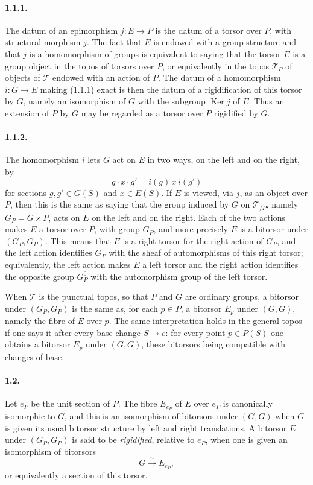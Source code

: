 \documentclass[11pt]{article}
\theoremstyle{plain}
\theoremstyle{definition}
\theoremstyle{remark}
\DeclareMathOperator{\Ker}{Ker}
\begin{document}
\paragraph{1.1.1.} The datum of an epimorphism $j:E\to P$ is the datum of a torsor over $P$, with structural morphism $j$. The fact that $E$ is endowed with a group structure and that $j$ is a homomorphism of groups is equivalent to saying that the torsor $E$ is a group object in the topos of torsors over $P$, or equivalently in the topos $\mathcal T_P$ of objects of $\mathcal T$ endowed with an action of $P$. The datum of a homomorphism $i:G\to E$ making (1.1.1) exact is then the datum of a rigidification of this torsor by $G$, namely an isomorphism of $G$ with the subgroup $\Ker j$ of $E$. Thus an extension of $P$ by $G$ may be regarded as a torsor over $P$ rigidified by $G$.

\paragraph{1.1.2.} The homomorphism $i$ lets $G$ act on $E$ in two ways, on the left and on the right, by
\[
g\cdot x\cdot g'=i(g)\,x\,i(g')
\]
for sections $g,g'\in G(S)$ and $x\in E(S)$. If $E$ is viewed, via $j$, as an object over $P$, then this is the same as saying that the group induced by $G$ on $\mathcal T_{/P}$, namely $G_P=G\times P$, acts on $E$ on the left and on the right. Each of the two actions makes $E$ a torsor over $P$, with group $G_P$, and more precisely $E$ is a bitorsor under $(G_P,G_P)$. This means that $E$ is a right torsor for the right action of $G_P$, and the left action identifies $G_P$ with the sheaf of automorphisms of this right torsor; equivalently, the left action makes $E$ a left torsor and the right action identifies the opposite group $G_P^0$ with the automorphism group of the left torsor.

When $\mathcal T$ is the punctual topos, so that $P$ and $G$ are ordinary groups, a bitorsor under $(G_P,G_P)$ is the same as, for each $p\in P$, a bitorsor $E_p$ under $(G,G)$, namely the fibre of $E$ over $p$. The same interpretation holds in the general topos if one says it after every base change $S\to e$: for every point $p\in P(S)$ one obtains a bitorsor $E_p$ under $(G,G)$, these bitorsors being compatible with changes of base.

\paragraph{1.2.} Let $e_P$ be the unit section of $P$. The fibre $E_{e_P}$ of $E$ over $e_P$ is canonically isomorphic to $G$, and this is an isomorphism of bitorsors under $(G,G)$ when $G$ is given its usual bitorsor structure by left and right translations. A bitorsor $E$ under $(G_P,G_P)$ is said to be \emph{rigidified}, relative to $e_P$, when one is given an isomorphism of bitorsors
\[
G\xrightarrow{\sim}E_{e_P},
\]
or equivalently a section of this torsor.
\end{document}
